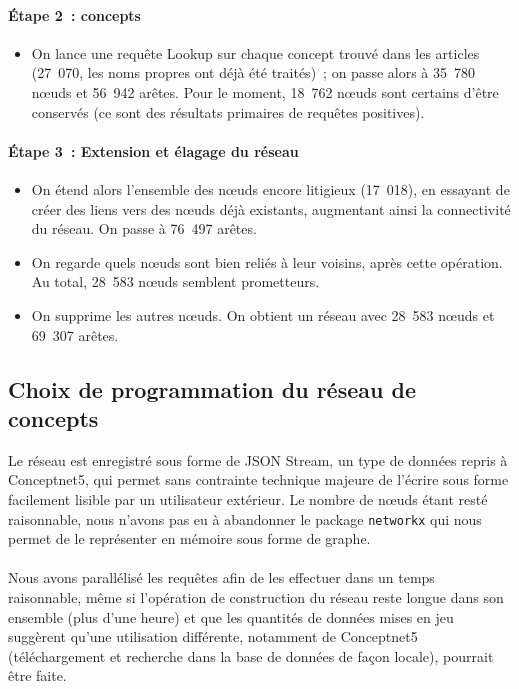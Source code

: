 \documentclass[a4paper, 12pt]{article}
\newcommand{\pyt}[1]{\texttt{#1}}%
\begin{document}
\paragraph{Étape 2~: concepts}

\begin{itemize}
 \item On lance une requête Lookup sur chaque concept trouvé dans les articles (27~070, les noms propres ont déjà été traités)~; on passe alors à 35~780 n\oe{}uds et 56~942 arêtes. Pour le moment, 18~762 n\oe{}uds sont certains d'être conservés (ce sont des résultats primaires de requêtes positives).
\end{itemize}


\paragraph{Étape 3~: Extension et élagage du réseau}

\begin{itemize}
 \item On étend alors l'ensemble des n\oe{}uds encore litigieux (17~018), en essayant de créer des liens vers des n\oe{}uds déjà existants, augmentant ainsi la connectivité du réseau. On passe à 76~497 arêtes.
 \item On regarde quels n\oe{}uds sont bien reliés à leur voisins, après cette opération. Au total, 28~583 n\oe{}uds semblent prometteurs.
 \item On supprime les autres n\oe{}uds. On obtient un réseau avec 28~583 n\oe{}uds et 69~307 arêtes.
\end{itemize}



\subsection{Choix de programmation du réseau de concepts}

Le réseau est enregistré sous forme de JSON Stream, un type de données repris à Conceptnet5, qui permet sans contrainte technique majeure de l'écrire sous forme facilement lisible par un utilisateur extérieur. Le nombre de nœuds étant resté raisonnable, nous n'avons pas eu à abandonner le package \pyt{networkx} qui nous permet de le représenter en mémoire sous forme de graphe.

\paragraph{}
Nous avons parallélisé les requêtes afin de les effectuer dans un temps raisonnable, même si l'opération de construction du réseau reste longue dans son ensemble (plus d'une heure) et que les quantités de données mises en jeu suggèrent qu'une utilisation différente, notamment de Conceptnet5 (téléchargement et recherche dans la base de données de façon locale), pourrait être faite.
\end{document}
